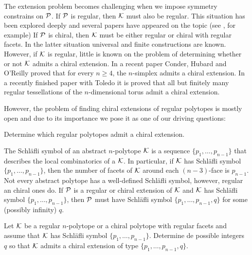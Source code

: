 The extension problem becomes challenging when we impose symmetry constrains on $\mathcal{P}$. 
If $\mathcal{P}$ is regular, then $\mathcal{K}$ must also be regular.
This situation has been explored deeply and several papers have appeared on the topic 
(see \cite{Pellicer2010_ExtensionsDuallyBipartite,Pellicer2009_ExtensionsRegularPolytopes,Schulte1985_ExtensionsRegularComplexes,Schulte1983_ArrangingRegularIncidence,Schulte1990_ClassAbstractPolytopes, Danzer1984_RegularIncidenceComplexes}, for example)
If $\mathcal{P}$ is chiral, then $\mathcal{K}$ must be either regular or chiral with regular facets.
In the latter situation universal \cite{SchulWeiss1995_FreeExtensionsChiral} and finite \cite{CunniPelli2014_ChiralExtensionsChiral,Montero2021_SchlaefliSymbolChiral} constructions are known.
However, if $\mathcal{K}$ is regular, little is known on the problem of determining whether or not $\mathcal{K}$ admits a chiral extension.
In a recent paper \cite{CondHubORe2024_ConstructionChiralPolytopes} Conder, Hubard and O'Reilly proved that for every $n \geq 4$, the $n$-simplex admits a chiral extension.
In a recently finished paper with Toledo \cite{MonteToled_ChiralExtensionsRegular_preprint} it is proved that all but finitely many regular tessellations of the $n$-dimensional torus admit a chiral extension.

However, the problem of finding chiral extensions of regular polytopes is mostly open and due to its importance we pose it as one of our driving questions:

\begin{problem}\label{prob:chirExt}
  Determine which regular polytopes admit a chiral extension.
 \end{problem}
 
 The Schläfli symbol of an abstract $n$-polytope $\mathcal{K}$ is a sequence $\{p_{1}, \dots, p_{n-1}\}$ that describes the local combinatorics of a $\mathcal{K}$. 
 In particular, if $\mathcal{K}$ has Schläfli symbol $\{p_{1}, \dots, p_{n-1}\}$, then the number of facets of $\mathcal{K}$ around each $(n-3)$-face is $p_{n-1}$.
Not every abstract polytope has a well-defined Schläfli symbol, however, regular an chiral ones do. 
If $\mathcal{P}$ is a regular or chiral extension of $\mathcal{K}$ and $\mathcal{K}$ has Schläfli symbol $\{p_{1}, \dots, p_{n-1}\}$, then $\mathcal{P}$ must have Schläfli symbol $\{p_{1}, \dots, p_{n-1}, q\}$ for some (possibly infinity) $q$.

\begin{problem} \label{prob:chirExtType}
  Let $\mathcal{K}$ be a regular $n$-polytope or a chiral polytope with regular facets and assume that $\mathcal{K}$ has Schläfli symbol $\{p_{1}, \dots, p_{n-1}\}$. Determine de possible integers $q$ so that $\mathcal{K}$ admits a chiral extension of type $\{p_{1}, \dots, p_{n-1}, q\}$.
\end{problem}

